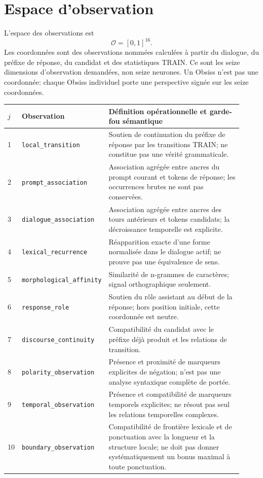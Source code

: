 \documentclass[11pt,a4paper]{report}
\newcommand{\Obs}{\mathcal O}
\begin{document}
\section{Espace d'observation}
L'espace des observations est
\[
\Obs=[0,1]^{16}.
\]
Les coordonnées sont des observations nommées calculées à partir du dialogue, du préfixe de réponse, du candidat et des statistiques TRAIN. Ce sont les seize dimensions d'observation demandées, non seize neurones. Un Obsiss n'est pas une coordonnée: chaque Obsiss individuel porte une perspective signée sur les seize coordonnées.

\begin{longtable}{p{0.055\linewidth}p{0.26\linewidth}p{0.61\linewidth}}
\toprule $j$ & Observation & Définition opérationnelle et garde-fou sémantique \\
\midrule
1 & \texttt{local\_transition} & Soutien de continuation du préfixe de réponse par les transitions TRAIN; ne constitue pas une vérité grammaticale.\\
2 & \texttt{prompt\_association} & Association agrégée entre ancres du prompt courant et tokens de réponse; les occurrences brutes ne sont pas conservées.\\
3 & \texttt{dialogue\_association} & Association agrégée entre ancres des tours antérieurs et tokens candidats; la décroissance temporelle est explicite.\\
4 & \texttt{lexical\_recurrence} & Réapparition exacte d'une forme normalisée dans le dialogue actif; ne prouve pas une équivalence de sens.\\
5 & \texttt{morphological\_affinity} & Similarité de n-grammes de caractères; signal orthographique seulement.\\
6 & \texttt{response\_role} & Soutien du rôle assistant au début de la réponse; hors position initiale, cette coordonnée est neutre.\\
7 & \texttt{discourse\_continuity} & Compatibilité du candidat avec le préfixe déjà produit et les relations de transition.\\
8 & \texttt{polarity\_observation} & Présence et proximité de marqueurs explicites de négation; n'est pas une analyse syntaxique complète de portée.\\
9 & \texttt{temporal\_observation} & Présence et compatibilité de marqueurs temporels explicites; ne résout pas seul les relations temporelles complexes.\\
10 & \texttt{boundary\_observation} & Compatibilité de frontière lexicale et de ponctuation avec la longueur et la structure locale; ne doit pas donner systématiquement un bonus maximal à toute ponctuation.\\

\end{longtable}
\end{document}
